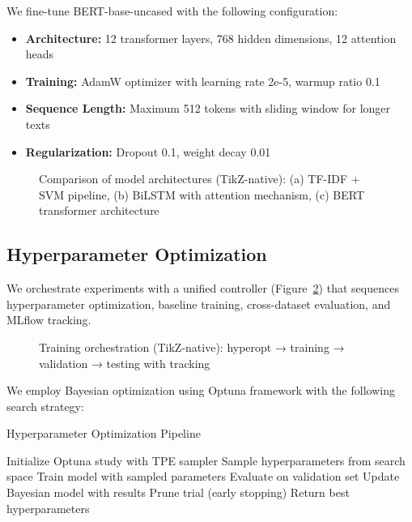 \documentclass[conference]{IEEEtran}
\begin{document}
We fine-tune BERT-base-uncased with the following configuration:

\begin{itemize}
    \item \textbf{Architecture:} 12 transformer layers, 768 hidden dimensions, 12 attention heads
    \item \textbf{Training:} AdamW optimizer with learning rate 2e-5, warmup ratio 0.1
    \item \textbf{Sequence Length:} Maximum 512 tokens with sliding window for longer texts
    \item \textbf{Regularization:} Dropout 0.1, weight decay 0.01
\end{itemize}

\begin{figure}[H]
    \centering
    \resizebox{\linewidth}{!}{\ArchitectureComparisonDiagram}
    \caption{Comparison of model architectures (TikZ-native): (a) TF-IDF + SVM pipeline, (b) BiLSTM with attention mechanism, (c) BERT transformer architecture}
    \label{fig:architectures}
\end{figure}

\subsection{Hyperparameter Optimization}

We orchestrate experiments with a unified controller (Figure~\ref{fig:training_orchestration}) that sequences hyperparameter optimization, baseline training, cross-dataset evaluation, and MLflow tracking.

\begin{figure}[H]
    \centering
    \resizebox{\linewidth}{!}{\TrainingOrchestrationDiagram}
    \caption{Training orchestration (TikZ-native): hyperopt → training → validation → testing with tracking}
    \label{fig:training_orchestration}
\end{figure}

We employ Bayesian optimization using Optuna framework with the following search strategy:

\begin{algorithm}[H]
\caption{Hyperparameter Optimization Pipeline}
\begin{algorithmic}[1]
\STATE Initialize Optuna study with TPE sampler
    \STATE Sample hyperparameters from search space
    \STATE Train model with sampled parameters
    \STATE Evaluate on validation set
    \STATE Update Bayesian model with results
        \STATE Prune trial (early stopping)
    \ENDIF
\ENDFOR
\STATE Return best hyperparameters
\end{algorithmic}
\end{algorithm}
\end{document}
